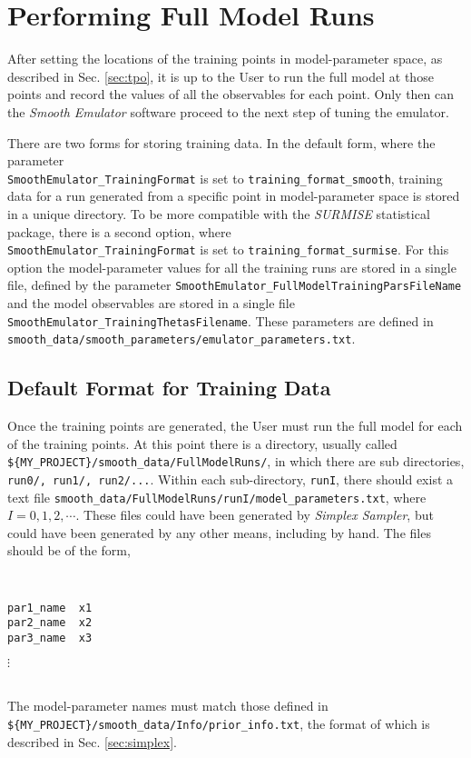 \documentclass[UserManual.tex]{subfiles}
\begin{document}
\setcounter{section}{3}
\section{Performing Full Model Runs}\label{sec:fullmodel}

After setting the locations of the training points in model-parameter space, as described in Sec. \ref{sec:tpo}, it is up to the User to run the full model at those points and record the values of all the observables for each point. Only then can the {\it Smooth Emulator} software proceed to the next step of tuning the emulator.

There are two forms for storing training data. In the default form, where the parameter\\
{\tt SmoothEmulator\_TrainingFormat} is set to {\tt training\_format\_smooth}, training data for a run generated from a specific point in model-parameter space is stored in a unique directory. To be more compatible with the {\it SURMISE} statistical package, there is a second option, where\\
{\tt SmoothEmulator\_TrainingFormat} is set to {\tt training\_format\_surmise}. For this option the model-parameter values for all the training runs are stored in a single file, defined by the parameter {\tt SmoothEmulator\_FullModelTrainingParsFileName} and the model observables are stored in a single file {\tt SmoothEmulator\_TrainingThetasFilename}. These parameters are defined in\\
{\tt smooth\_data/smooth\_parameters/emulator\_parameters.txt}. 

\subsection{Default Format for Training Data}

Once the training points are generated, the User must run the full model for each of the training points. At this point there is a directory, usually called {\tt \$\{MY\_PROJECT\}/smooth\_data/FullModelRuns/}, in which there are sub directories, {\tt run0/, run1/, run2/...}.  Within each sub-directory, {\tt runI}, there should exist a text file {\tt smooth\_data/FullModelRuns/runI/model\_parameters.txt}, where $I=0,1,2,\cdots$. These files could have been generated by {\it Simplex Sampler}, but could have been generated by any other means, including by hand. The files should be of the form,
{\tt
\begin{verbatim}
par1_name  x1
par2_name  x2
par3_name  x3
\end{verbatim}\vspace*{-20pt}\hspace*{24pt}$\vdots$
}\\
The model-parameter names must match those defined in \\{\tt \$\{MY\_PROJECT\}/smooth\_data/Info/prior\_info.txt}, the format of which is described in Sec. \ref{sec:simplex}. 
\end{document}
